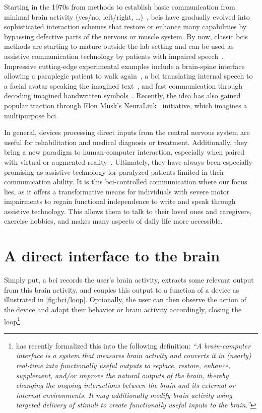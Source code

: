 Starting in the 1970s from methods to establish basic communication from minimal brain
activity (yes/no, left/right, \ldots)~\cite{Wolpaw2002}, \acp{bci} have gradually evolved
into sophisticated interaction schemes that restore or enhance many capabilities by
bypassing defective parts of the nervous or muscle system.
By now, classic \acp{bci} methods are starting to mature outside the lab setting and can
be used as assistive communication technology by patients with impaired
speech~\cite{Wolpaw2018,Milekovic2018}.
Impressive cutting-edge experimental examples include a brain-spine interface allowing a
paraplegic patient to walk again~\cite{Lorach2023}, a \ac{bci} translating internal
speech to a facial avatar speaking the imagined text~\cite{Metzger2023}, and fast
communication through decoding imagined handwritten symbols~\cite{Willett2021}.
Recently, the idea has also gained popular traction through Elon Musk's
NeuraLink~\cite{Musk2019} initiative, which imagines a multipurpose \ac{bci}.

In general, devices processing direct inputs from the central nervous system are useful
for rehabilitation and medical diagnosis or treatment.
Additionally, they bring a new paradigm to human-computer interaction, especially when
paired with virtual or augmented reality~\cite{SiMohammed2017}.
Ultimately, they have always been especially promising as assistive technology for
paralyzed patients limited in their communication ability.
It is this \ac{bci}-controlled communication where our focus lies, as it offers a
transformative means for individuals with severe motor impairments to regain functional
independence to write and speak through assistive technology.
This allows them to talk to their loved ones and caregivers, exercise hobbies, and makes
many aspects of daily life more accessible.

\section{A direct interface to the brain}

Simply put, a \ac{bci} records the user's brain activity, extracts some relevant output
from this brain activity, and couples this output to a function of a device as
illustrated in \cref{fig:bci/loop}.
Optionally, the user can then observe the action of the device and adapt their behavior
or brain activity accordingly, closing the loop\footnote{\textcite{BCISociety2024} has
recently formalized this into the following definition: \it``A brain-computer interface
is a system that measures brain activity and converts it in (nearly) real-time into
functionally useful outputs to replace, restore, enhance, supplement, and/or improve the
natural outputs of the brain, thereby changing the ongoing interactions between the
brain and its external or internal environments.
It may additionally modify brain activity using targeted delivery of stimuli to create
functionally useful inputs to the brain.''}.

